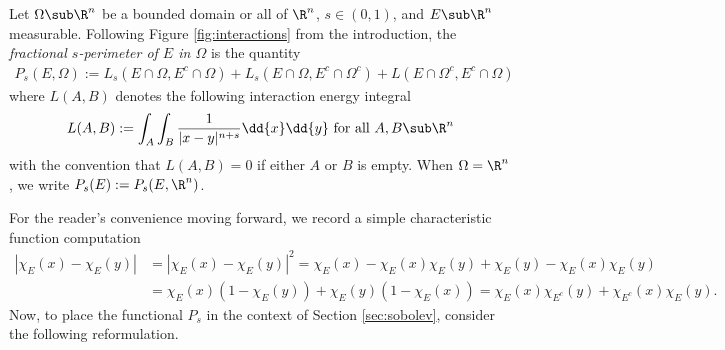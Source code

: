 \documentclass[../main.tex]{subfiles}
\begin{document}
%
%
%
%
%
%
%
%
%
%
\begin{definition}\label{def:sperim}
    Let $ \Omega\sub \R^{n} $ be a bounded domain or all of $ \R^{n} $, $ s\in (0,1) $, and $ E\sub \R^{n} $ measurable. Following Figure \ref{fig:interactions} from the introduction, the \textit{fractional $ s $-perimeter of $ E $ in $ \Omega $} is the quantity
    \begin{align*}
        P_{s}(E, \Omega) := L_{s}(E\cap \Omega, E^{c}\cap \Omega) + L_{s}(E\cap \Omega, E^{c}\cap \Omega^{c}) + L(E\cap \Omega^{c}, E^{c} \cap \Omega)
    \end{align*}
    where $ L(A,B) $ denotes the following interaction energy integral
    \[
        L(A,B) := \int_{A}\int_{B}\frac{1}{|x-y|^{n+s}}\dd{x}\dd{y} \text{ for all } A,B\sub \R^{n}
    \]
    with the convention that $ L(A,B) = 0 $ if either $ A $ or $ B $ is empty. When $ \Omega =\R^{n} $, we write $ P_{s}(E):= P_{s}(E,\R^{n}) $.
\end{definition}
For the reader's convenience moving forward, we record a simple characteristic function computation
\begin{align*}
    | \chi_{E}(x) - \chi_{E}(y)| &= | \chi_{E}(x) - \chi_{E}(y)|^{2} = \chi_{E}(x)-\chi_{E}(x) \chi_{E}(y) +\chi_{E}(y) -\chi_{E}(x) \chi_{E}(y)\\
    &= \chi_{E}(x)(1- \chi_{E}(y)) + \chi_{E}(y)(1-\chi_{E}(x)) = \chi_{E}(x) \chi_{E^{c}}(y) + \chi_{E^{c}}(x) \chi_{E}(y).
\end{align*}
Now, to place the functional $ P_{s} $ in the context of Section \ref{sec:sobolev}, consider the following reformulation. 
\end{document}
